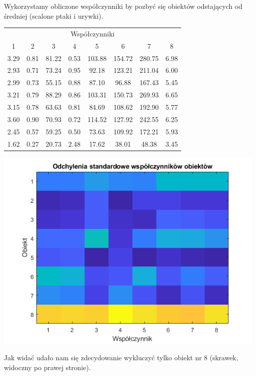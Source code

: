 \documentclass{article}
\begin{document}
	Wykorzystamy obliczone współczynniki by pozbyć się obiektów odstających od średniej (scalone ptaki i urywki).
	
	\begin{table}
		\begin{center}
			\begin{tabular}{c|c|c|c|c|c|c|c}
				\multicolumn{8}{c}{Współczynniki}\\
				1 & 2 & 3 & 4 & 5 & 6 & 7 & 8\\
				\hline
				3.29 & 0.81 & 81.22 & 0.53 & 103.88 & 154.72 & 280.75 & 6.98 \\
				2.93 & 0.71 & 73.24 & 0.95 & 92.18  & 123.21 & 211.04 & 6.00 \\
				2.99 & 0.73 & 55.15 & 0.88 & 87.10  & 96.88  & 167.43 & 5.45 \\
				3.21 & 0.79 & 88.29 & 0.86 & 103.31 & 150.73 & 269.93 & 6.65 \\
				3.15 & 0.78 & 63.63 & 0.81 & 84.69  & 108.62 & 192.90 & 5.77 \\
				3.60 & 0.90 & 70.93 & 0.72 & 114.52 & 127.92 & 242.55 & 6.25 \\
				2.45 & 0.57 & 59.25 & 0.50 & 73.63  & 109.92 & 172.21 & 5.93 \\
				1.62 & 0.27 & 20.73 & 2.48 & 17.62  & 38.01  & 48.38  & 3.45 \\
			\end{tabular}
		\end{center}
	\end{table}

	\begin{center}
		\includegraphics[width=\linewidth]{../../lab06/ptaki_err.png}
	\end{center}
	Jak widać udało nam się zdecydowanie wykluczyć tylko obiekt nr 8 (skrawek, widoczny po prawej stronie). 
	
\end{document}
